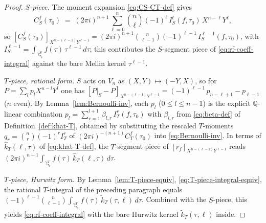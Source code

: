 \documentclass[11pt]{article}
\numberwithin{equation}{section}  %
\newcommand{\QQ}{\mathbb{Q}}
\begin{document}
\begin{proof}
\emph{$S$-piece.}  The moment expansion \eqref{eq:CS-CT-def} gives
\begin{equation}
  C^f_S(\tau_0)
  \;=\; (2\pi i)^{n + 1}\!\sum_{\ell = 0}^{n}\!\binom{n}{\ell}(-1)^\ell\,
  I_S^\ell(f, \tau_0)\,X^{n - \ell} Y^\ell,
\end{equation}
so $[C^f_S(\tau_0)]_{X^{n - (\ell - 1)} Y^{\ell - 1}} = (2\pi i)^{n + 1}
\binom{n}{\ell - 1}(-1)^{\ell - 1}\,I_S^{\ell - 1}(f, \tau_0)$, with
$I_S^{\ell - 1} = \int_{\gamma^S_{\tau_0}} f(\tau)\,\tau^{\ell - 1}\,d\tau$;
this contributes the $S$-segment piece of \eqref{eq:rf-coeff-integral}
against the bare Mellin kernel $\tau^{\ell - 1}$.

\emph{$T$-piece, rational form.}  $S$ acts on $V_n$ as
$(X, Y) \mapsto (-Y, X)$, so for $P = \sum_l p_l X^{n - l} Y^l$ one has
$[P|_S - P]_{X^{n - (\ell - 1)} Y^{\ell - 1}} = (-1)^{\ell - 1}\,p_{n - \ell + 1}
- p_{\ell - 1}$ ($n$ even).  By Lemma~\ref{lem:Bernoulli-inv}, each
$p_l$ ($0 \le l \le n - 1$) is the explicit $\QQ$-linear combination
$p_l = \sum_{r = 1}^{l + 1} \beta_{l, r}\,I_T^r(f, \tau_0)$
with $\beta_{l, r}$ from \eqref{eq:beta-def} of
Definition~\ref{def:khat-T}, obtained by substituting the rescaled
$T$-moments $q_r = \binom{n}{r}(-1)^r I_T^r$ of
$(2\pi i)^{-(n + 1)} C^f_T(\tau_0)$ into \eqref{eq:Bernoulli-inv}.  In
terms of $\widehat{k}_T(\ell, \tau)$ of \eqref{eq:khat-T-def}, the
$T$-segment piece of $[r_f]_{X^{n - (\ell - 1)} Y^{\ell - 1}}$ reads
$(2\pi i)^{n + 1}\!\int_{\gamma^T_{\tau_0}}\! f(\tau)\,\widehat{k}_T(\ell, \tau)\,d\tau$.

\emph{$T$-piece, Hurwitz form.}  By Lemma~\ref{lem:T-piece-equiv},
\eqref{eq:T-piece-integral-equiv}, the rational $T$-integral of the
preceding paragraph equals
$(-1)^{\ell - 1}\binom{n}{\ell - 1}\!\int_{\gamma^T_{\tau_0}}\! f(\tau)\,\widetilde{k}_T(\tau, \ell)\,d\tau$.
Combined with the $S$-piece, this yields \eqref{eq:rf-coeff-integral}
with the bare Hurwitz kernel $\widetilde{k}_T(\tau, \ell)$ inside.
\end{proof}
\end{document}

